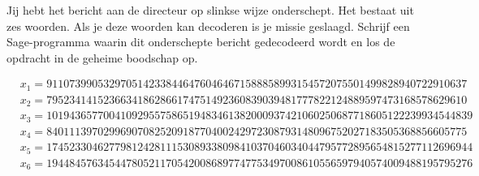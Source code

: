 Jij hebt het bericht aan de directeur op slinkse wijze onderschept. Het bestaat uit zes woorden. Als je deze woorden kan decoderen is je missie geslaagd. Schrijf een Sage-programma waarin dit onderschepte bericht gedecodeerd wordt en los de opdracht in de geheime boodschap op.

\[
\begin{aligned}
&x_1=91107399053297051423384464760464671588858993154572075501499828940722910637\\
&x_2=79523414152366341862866174751492360839039481777822124889597473168578629610\\
&x_3=101943657700410929557586519483461382000937421060250687718605122239934544839\\
&x_4=84011139702996907082520918770400242972308793148096752027183505368856605775\\
&x_5=174523304627798124281115308933809841037046034044795772895654815277112696944\\
&x_6=194484576345447805211705420086897747753497008610556597940574009488195795276\\
\end{aligned}
\]


\pagebreak
\tableofcontents

